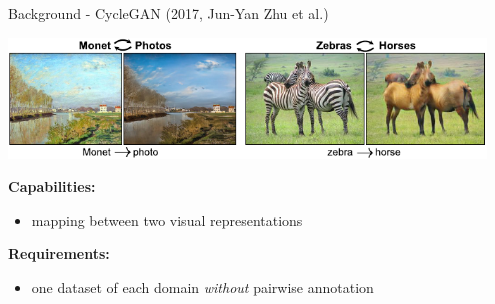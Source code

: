 \documentclass[aspectratio=169]{beamer}
\begin{document}
\begin{frame}{Background - CycleGAN (2017, Jun-Yan Zhu et al.)}
\vspace{-1em}
\begin{center}
\includegraphics[width=0.95\textwidth]{assets/cyclegan_examples_small.pdf}
\end{center}
\vspace{-1em}
\textbf{Capabilities:}
\begin{itemize}
\item mapping between two visual representations
\end{itemize}
\textbf{Requirements:}
\begin{itemize}
\item one dataset of each domain \emph{without} pairwise annotation
\end{itemize}
\end{frame}
\end{document}
